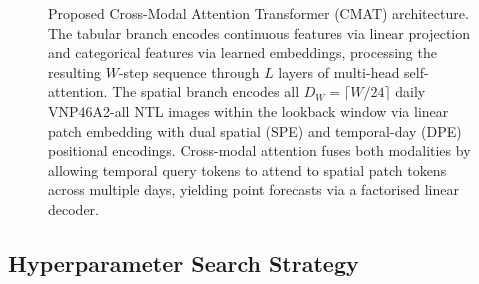 \begin{figure}[htbp]
{%
}
\caption{Proposed Cross-Modal Attention Transformer (CMAT) architecture. The tabular branch encodes continuous features via linear projection and categorical features via learned embeddings, processing the resulting $W$-step sequence through $L$ layers of multi-head self-attention. The spatial branch encodes all $D_W = \lceil W/24 \rceil$ daily VNP46A2-all NTL images within the lookback window via linear patch embedding with dual spatial (SPE) and temporal-day (DPE) positional encodings. Cross-modal attention fuses both modalities by allowing temporal query tokens to attend to spatial patch tokens across multiple days, yielding point forecasts via a factorised linear decoder.}
\label{fig:architecture}
\end{figure}

\subsection{Hyperparameter Search Strategy}
\label{subsec:hyperparameter_search}

